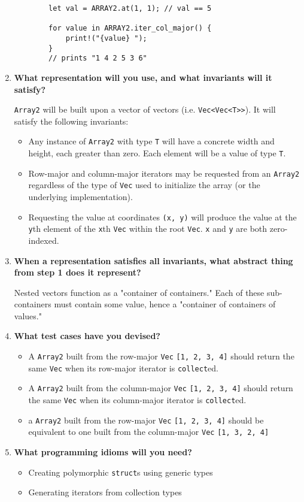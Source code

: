 \documentclass[12pt, letterpaper]{article}
\begin{document}
\begin{enumerate}
\begin{verbatim}
        let val = ARRAY2.at(1, 1); // val == 5

        for value in ARRAY2.iter_col_major() {
            print!("{value} ");
        }
        // prints "1 4 2 5 3 6"
    \end{verbatim}

    \item \textbf{What representation will you use, and what invariants will it satisfy?}
    
    \verb|Array2| will be built upon a vector of vectors (i.e. \verb|Vec<Vec<T>>|). It will satisfy the following invariants:

    \begin{itemize}
        \item Any instance of \verb|Array2| with type \verb|T| will have a concrete width and height, each greater than zero. Each element will be a value of type \verb|T|.
        \item Row-major and column-major iterators may be requested from an \verb|Array2| regardless of the type of \verb|Vec| used to initialize the array (or the underlying implementation).
        \item Requesting the value at coordinates \verb|(x, y)| will produce the value at the \verb|y|th element of the \verb|x|th \verb|Vec| within the root \verb|Vec|. \verb|x| and \verb|y| are both zero-indexed.
    \end{itemize}

    \item \textbf{When a representation satisfies all invariants, what abstract thing from
    step 1 does it represent?}

    Nested vectors function as a "container of containers." Each of these sub-containers must contain some value, hence a "container of containers of values."

    \item \textbf{What test cases have you devised?}
    
    \begin{itemize}
        \item A \verb|Array2| built from the row-major \verb|Vec| \verb|[1, 2, 3, 4]| should return the same \verb|Vec| when its row-major iterator is \verb|collect|ed.
        \item A \verb|Array2| built from the column-major \verb|Vec| \verb|[1, 2, 3, 4]| should return the same \verb|Vec| when its column-major iterator is \verb|collect|ed.

        \item a \verb|Array2| built from the row-major \verb|Vec| \verb|[1, 2, 3, 4]| should be equivalent to one built from the column-major \verb|Vec| \verb|[1, 3, 2, 4]|
    \end{itemize}
    
    \item \textbf{What programming idioms will you need?}
    
    \begin{itemize}
        \item Creating polymorphic \verb|struct|s using generic types
        \item Generating iterators from collection types
    \end{itemize}

\end{enumerate}
\end{document}
